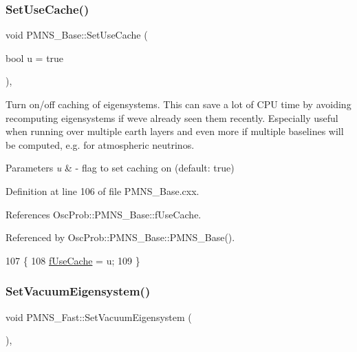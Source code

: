 \subsubsection{\texorpdfstring{Set\+Use\+Cache()}{SetUseCache()}}
{\footnotesize\ttfamily void P\+M\+N\+S\+\_\+\+Base\+::\+Set\+Use\+Cache (\begin{DoxyParamCaption}\item[{bool}]{u = {\ttfamily true} }\end{DoxyParamCaption})\hspace{0.3cm}{\ttfamily [virtual]}, {\ttfamily [inherited]}}

Turn on/off caching of eigensystems. This can save a lot of C\+PU time by avoiding recomputing eigensystems if we\textquotesingle{}ve already seen them recently. Especially useful when running over multiple earth layers and even more if multiple baselines will be computed, e.\+g. for atmospheric neutrinos.


\begin{DoxyParams}{Parameters}
{\em u} & -\/ flag to set caching on (default\+: true) \\
\hline
\end{DoxyParams}


Definition at line 106 of file P\+M\+N\+S\+\_\+\+Base.\+cxx.



References Osc\+Prob\+::\+P\+M\+N\+S\+\_\+\+Base\+::f\+Use\+Cache.



Referenced by Osc\+Prob\+::\+P\+M\+N\+S\+\_\+\+Base\+::\+P\+M\+N\+S\+\_\+\+Base().


\begin{DoxyCode}
107 \{
108   \hyperlink{classOscProb_1_1PMNS__Base_ad28c12ef897b5555eda509ea55c99107}{fUseCache} = u; 
109 \}
\end{DoxyCode}
\mbox{\label{classOscProb_1_1PMNS__Fast_a76dd5a761df8689c502b28ad0391f9e2}} 
\subsubsection{\texorpdfstring{Set\+Vacuum\+Eigensystem()}{SetVacuumEigensystem()}}
{\footnotesize\ttfamily void P\+M\+N\+S\+\_\+\+Fast\+::\+Set\+Vacuum\+Eigensystem (\begin{DoxyParamCaption}{ }\end{DoxyParamCaption})\hspace{0.3cm}{\ttfamily [protected]}, {\ttfamily [virtual]}}


